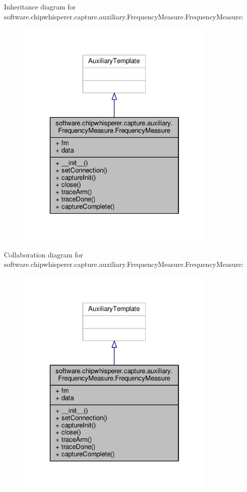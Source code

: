 Inheritance diagram for software.\+chipwhisperer.\+capture.\+auxiliary.\+Frequency\+Measure.\+Frequency\+Measure\+:\nopagebreak
\begin{figure}[H]
\begin{center}
\leavevmode
\includegraphics[width=274pt]{d7/dd9/classsoftware_1_1chipwhisperer_1_1capture_1_1auxiliary_1_1FrequencyMeasure_1_1FrequencyMeasure__inherit__graph}
\end{center}
\end{figure}


Collaboration diagram for software.\+chipwhisperer.\+capture.\+auxiliary.\+Frequency\+Measure.\+Frequency\+Measure\+:\nopagebreak
\begin{figure}[H]
\begin{center}
\leavevmode
\includegraphics[width=274pt]{dc/d53/classsoftware_1_1chipwhisperer_1_1capture_1_1auxiliary_1_1FrequencyMeasure_1_1FrequencyMeasure__coll__graph}
\end{center}
\end{figure}


